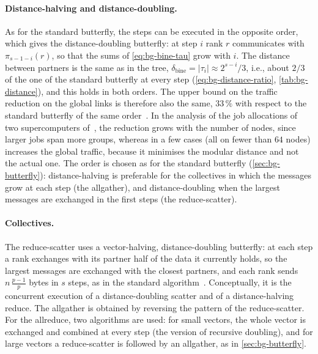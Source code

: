 \paragraph{Distance-halving and distance-doubling.}
As for the standard butterfly, the steps can be executed in the opposite order, which gives the distance-doubling \bine{} butterfly: at step $i$ rank $r$ communicates with $\pi_{s-1-i}(r)$, so that the sums of \cref{eq:bg-bine-tau} grow with $i$.
The distance between partners is the same as in the \bine{} tree, $\delta_{\text{bine}}=\lvert\tau_i\rvert\approx 2^{s-i}/3$, i.e., about $2/3$ of the one of the standard butterfly at every step (\cref{eq:bg-distance-ratio}, \cref{tab:bg-distance}), and this holds in both orders.
The upper bound on the traffic reduction on the global links is therefore also the same, $33\,\%$ with respect to the standard butterfly of the same order~\cite{desensi2025bine}.
In the analysis of the job allocations of two supercomputers of~\cite{desensi2025bine}, the reduction grows with the number of nodes, since larger jobs span more groups, whereas in a few cases (all on fewer than $64$ nodes) \bine{} increases the global traffic, because it minimises the modular distance and not the actual one.
The order is chosen as for the standard butterfly (\cref{sec:bg-butterfly}): distance-halving is preferable for the collectives in which the messages grow at each step (the allgather), and distance-doubling when the largest messages are exchanged in the first steps (the reduce-scatter).

\paragraph{Collectives.}
The reduce-scatter uses a vector-halving, distance-doubling \bine{} butterfly: at each step a rank exchanges with its partner half of the data it currently holds, so the largest messages are exchanged with the closest partners, and each rank sends $n\,\tfrac{p-1}{p}$ bytes in $s$ steps, as in the standard algorithm~\cite{desensi2025bine}.
Conceptually, it is the concurrent execution of a distance-doubling scatter and of a distance-halving reduce.
The allgather is obtained by reversing the pattern of the reduce-scatter.
For the allreduce, two algorithms are used: for small vectors, the whole vector is exchanged and combined at every step (the \bine{} version of recursive doubling), and for large vectors a reduce-scatter is followed by an allgather, as in \cref{sec:bg-butterfly}.

